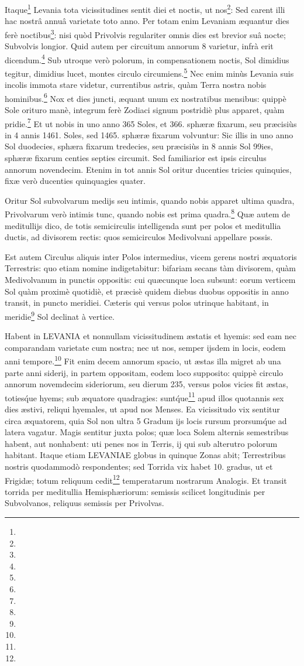 \documentclass[a4paper, 11pt, oneside, polutonikogreek, german]{article}
\begin{document}
Itaque\footnote{} Levania tota vicissitudines sentit diei et noctis, ut nos\footnote{}: Sed carent illi hac nostrâ annuâ varietate toto anno. Per totam enim Levaniam æquantur dies ferè noctibus\footnote{}: nisi quòd Privolvis regulariter omnis dies est brevior suâ nocte; Subvolvis longior. Quid autem per circuitum annorum 8 varietur, infrà erit dicendum.\footnote{} Sub utroque verò polorum, in compensationem noctis, Sol dimidius tegitur, dimidius lucet, montes circulo circumiens.\footnote{} Nec enim minùs Levania suis incolis immota stare videtur, currentibus astris, quàm Terra nostra nobis hominibus.\footnote{} Nox et dies juncti, æquant unum ex nostratibus mensibus: quippè Sole orituro manè, integrum ferè Zodiaci signum postridiè plus apparet, quàm pridie.\footnote{} Et ut nobis in uno anno 365 Soles, et 366. sphæræ fixarum, seu præcisiùs in 4 annis 1461. Soles, sed 1465. sphæræ fixarum volvuntur: Sic illis in uno anno Sol duodecies, sphæra fixarum tredecies, seu præcisiùs in 8 annis Sol 99ies, sphæræ fixarum centies septies circumit. Sed familiarior est ipsis circulus annorum novendecim. Etenim in tot annis Sol oritur ducenties tricies quinquies, fixæ verò ducenties quinquagies quater.

Oritur Sol subvolvarum medijs seu intimis, quando nobis apparet ultima quadra, Privolvarum verò intimis tunc, quando nobis est prima quadra.\footnote{} Quæ autem de meditullijs dico, de totis semicirculis intelligenda sunt per polos et meditullia ductis, ad divisorem rectis: quos semicirculos Medivolvani appellare possis.

Est autem Circulus aliquis inter Polos intermedius, vicem gerens nostri æquatoris Terrestris: quo etiam nomine indigetabitur: bifariam secans tàm divisorem, quàm Medivolvanum in punctis oppositis: cui quæcunque loca subsunt: eorum verticem Sol quàm proximè quotidiè, et præcisè quidem diebus duobus oppositis in anno transit, in puncto meridiei. Cæteris qui versus polos utrinque habitant, in meridie\footnote{} Sol declinat à vertice.

Habent in LEVANIA et nonnullam vicissitudinem æstatis et hyemis: sed eam nec comparandam varietate cum nostra; nec ut nos, semper ijsdem in locis, eodem anni tempore.\footnote{} Fit enim decem annorum spacio, ut æstas illa migret ab una parte anni siderij, in partem oppositam, eodem loco supposito: quippè circulo annorum novemdecim sideriorum, seu dierum 235, versus polos vicies fit æstas, toties\'que hyems; sub æquatore quadragies: sunt\'que\footnote{} apud illos quotannis sex dies æstivi, reliqui hyemales, ut apud nos Menses. Ea vicissitudo vix sentitur circa æquatorem, quia Sol non ultra 5 Gradum ijs locis rursum prorsum\'que ad latera vagatur. Magis sentitur juxta polos; quæ loca Solem alternis semestribus habent, aut nonhabent: uti penes nos in Terris, ij qui sub alterutro polorum habitant. Itaque etiam LEVANIAE globus in quinque Zonas abit; Terrestribus nostris quodammodò respondentes; sed Torrida vix habet 10. gradus, ut et Frigidæ; totum reliquum cedit\footnote{} temperatarum nostrarum Analogis. Et transit torrida per meditullia Hemisphæriorum: semissis scilicet longitudinis per Subvolvanos, reliquus semissis per Privolvas.
\end{document}

